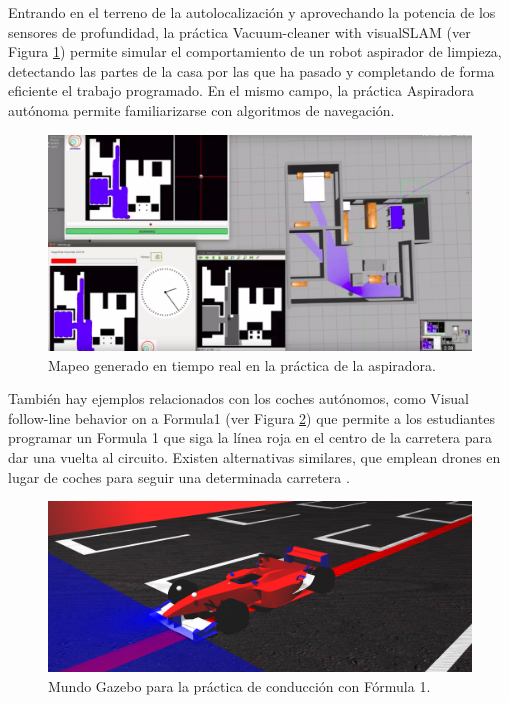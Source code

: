 \documentclass[12pt,spanish,chapterprefix, numbers=noenddot]{book}
\numberwithin{equation}{section}
\numberwithin{figure}{section}
\begin{document}
Entrando en el terreno de la autolocalización y aprovechando la potencia de los sensores de profundidad, la práctica Vacuum-cleaner with visualSLAM (ver Figura \ref{fig:vacuum}) permite simular el comportamiento de un robot aspirador de limpieza, detectando las partes de la casa por las que ha pasado y completando de forma eficiente el trabajo programado. En el mismo campo, la práctica Aspiradora autónoma \cite{Vanessa} permite familiarizarse con algoritmos de navegación. 

\begin{figure}[hbt!]
\centering
\includegraphics[width=12cm]{Figs/vacuumcleaner.png}
\par
\caption{\label{fig:vacuum}Mapeo generado en tiempo real en la práctica de la aspiradora.}
\end{figure}

También hay ejemplos relacionados con los coches autónomos, como Visual follow-line behavior on a Formula1 (ver Figura \ref{fig:f1}) que permite a los estudiantes programar un Formula 1 que siga la línea roja en el centro de la carretera para dar una vuelta al circuito. Existen alternativas similares, que emplean drones en lugar de coches para seguir una determinada carretera \cite{Pablo}.

\begin{figure}[hbt!]
\centering
\includegraphics[width=12cm]{Figs/f1.png}
\par
\caption{\label{fig:f1}Mundo Gazebo para la práctica de conducción con Fórmula 1.}
\end{figure}
\end{document}
